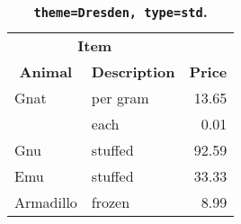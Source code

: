 \begin{table}[!htb]
\large
\centering
\begin{tabular}{|l||l|r|}
\hline
\multicolumn{2}{|c|}{\textbf{Item}}    & \multicolumn{1}{c|}{\textbf{}}            \\
\multicolumn{1}{|c||}{\textbf{Animal}} & \multicolumn{1}{c|}{\textbf{Description}} & \multicolumn{1}{c|}{\textbf{Price}} \\
\hline
\hline
Gnat      & per gram & 13.65 \\
          & each     & 0.01  \\
Gnu       & stuffed  & 92.59 \\
Emu       & stuffed  & 33.33 \\
Armadillo & frozen   & 8.99  \\
\hline
\end{tabular}
\caption[\texttt{theme=Dresden, type=std}]{\textbf{\texttt{theme=Dresden, type=std}. }}
\end{table}
